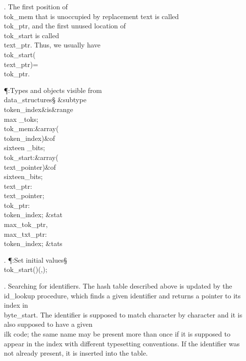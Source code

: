 . The first position of \\{tok\_mem}
that is unoccupied by replacement text is called \\{tok\_ptr}, and the first
unused location of \\{tok\_start} is called \\{text\_ptr}.
Thus, we usually have \\{tok\_start}\?(\?\\{text\_ptr}\?)=\?\\{tok\_ptr}.

\Y\P\?\4:Types and objects visible from \\{data\_structures}\X\mathrel{+}\S%
\?\6
\&{subtype}\8\\{token\_index}\8\&{is}\8\8\&{range}\?\to\?\\{max%
\_toks};\6
\\{tok\_mem}\?:\1\&{array}\8\1(\?\\{token\_index}\?\2)\2\8\&{of}\?\8\\{sixteen%
\_bits};\6
\\{tok\_start}\?:\1\&{array}\8\1(\?\\{text\_pointer}\?\2)\2\8\&{of}\?\8%
\\{sixteen\_bits};\6
\\{text\_ptr}\?:\?\\{text\_pointer}\?\K{};\6
\\{tok\_ptr}\?:\?\\{token\_index}\?\K{};\6
\&{stat}\1\6
\\{max\_tok\_ptr}\?,\?\\{max\_txt\_ptr}\?:\?\\{token\_index}\?\K{};%
\2\6
\&{tats}\par
\fi

. \P\?:Set initial values\X\mathrel{+}\S\?\6
\\{tok\_start}\?\1(\?\to{}\?\2)\K\1(\?,\?\2)\?;\par
\fi

.  Searching for identifiers.
The hash table described above is updated by the \\{id\_lookup} procedure,
which finds a given identifier and returns a pointer to its index in
\\{byte\_start}. The identifier is supposed to match character by character
and it is also supposed to have a given \\{ilk} code; the same name may be
present more than once if it is supposed to appear in the index with
different typesetting conventions.
If the identifier was not already present, it is inserted into the table.

